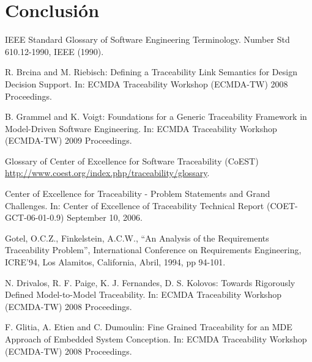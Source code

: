 \documentclass[a4paper,12pt,oneside,spanish]{book}
\begin{document}
\backmatter

\chapter{Conclusión}





\printglossaries





\begin{thebibliography}{99}


 IEEE Standard Glossary of Software Engineering Terminology. Number Std 610.12-1990, IEEE (1990).

 R. Brcina and M. Riebisch: Defining a Traceability Link Semantics for Design Decision Support. In: ECMDA Traceability Workshop (ECMDA-TW) 2008 Proceedings.

 B. Grammel and K. Voigt: Foundations for a Generic Traceability Framework in Model-Driven Software Engineering. In: ECMDA Traceability Workshop (ECMDA-TW) 2009 Proceedings.

 Glossary of Center of Excellence for Software Traceability (CoEST) \url{http://www.coest.org/index.php/traceability/glossary}.

 Center of Excellence for Traceability - Problem Statements and Grand Challenges. In: Center of Excellence of Traceability Technical Report (COET-GCT-06-01-0.9) September 10, 2006.

 Gotel, O.C.Z., Finkelstein, A.C.W., “An Analysis of the Requirements Traceability Problem”, International Conference on Requirements Engineering, ICRE’94, Los Alamitos, California, Abril, 1994, pp 94-101.

 N. Drivalos, R. F. Paige, K. J. Fernandes, D. S. Kolovos: Towards Rigorously Defined Model-to-Model Traceability. In: ECMDA Traceability Workshop (ECMDA-TW) 2008 Proceedings.

 F. Glitia, A. Etien and C. Dumoulin: Fine Grained Traceability for an MDE Approach of Embedded System Conception. In: ECMDA Traceability Workshop (ECMDA-TW) 2008 Proceedings.


\end{thebibliography}
\end{document}
